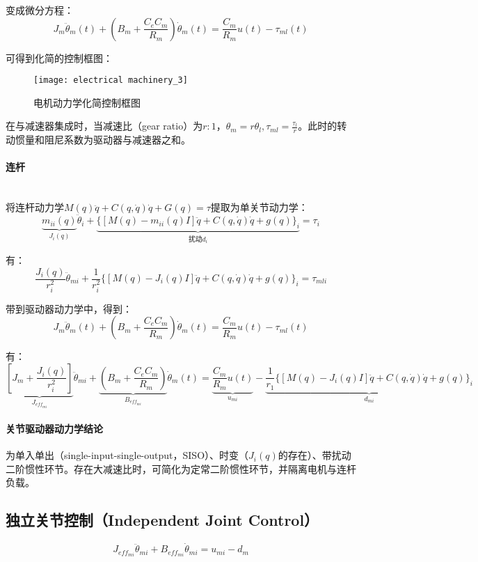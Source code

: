 \documentclass[
12pt, %
a4paper, 
oneside, %
headinclude,footinclude, %
]{scrartcl}
\begin{document}
变成微分方程：
$$ J_m \ddot{\theta}_m(t) + (B_m + \frac{C_e C_m}{R_m}) \dot{\theta}_m(t) = \frac{C_m}{R_m} u(t) - \tau_{ml}(t) $$

可得到化简的控制框图：
\begin{figure}[H]
\centering 
\texttt{[image: electrical machinery\_3]} 
\caption{电机动力学化简控制框图}
\end{figure}

在与减速器集成时，当减速比（gear ratio）为$ r:1 $，$ \theta_m = r \theta_l, \tau_{ml} = \frac{\tau_l}{r} $。此时的转动惯量和阻尼系数为驱动器与减速器之和。
\paragraph{连杆}~\\

将连杆动力学$ M(q)\ddot{q} + C(q, \dot{q})\dot{q} + G(q) = \tau $提取为单关节动力学：
$$ \underbrace{m_{ii}(q)}_{J_i(q)}\ddot{\theta}_i + \underbrace{\{[M(q) - m_{ii}(q)I]\ddot{q} + C(q, \dot{q})\dot{q} + g(q)\}_i}_{\text{扰动}d_i} = \tau_i $$

有：
$$ \frac{J_i(q)}{r_i^2}\ddot{\theta}_{mi} + \frac{1}{r_i^2}\{[M(q) - J_i(q)I]\ddot{q} + C(q, \dot{q})\dot{q} + g(q)\}_i = \tau_{mli} $$

带到驱动器动力学中，得到：
$$ J_m\ddot{\theta}_m(t) + (B_m + \frac{C_e C_m}{R_m})\dot{\theta}_m(t) = \frac{C_m}{R_m}u(t) - \tau_{ml}(t) $$

有：
$$ \underbrace{[J_m + \frac{J_i(q)}{r_i^2}]}_{J_{eff_{mi}}}\ddot{\theta}_{mi} + \underbrace{(B_m + \frac{C_e C_m}{R_m})}_{B_{eff_{mi}}}\dot{\theta}_m(t) = \underbrace{\frac{C_m}{R_m}u(t)}_{u_{mi}} - \underbrace{\frac{1}{r_1}\{[M(q) - J_i(q)I]\ddot{q} + C(q, \dot{q})\dot{q} + g(q)\}_i}_{d_{mi}} $$
\paragraph{关节驱动器动力学结论}
为单入单出（single-input-single-output，SISO）、时变（$ J_i(q) $的存在）、带扰动二阶惯性环节。存在大减速比时，可简化为定常二阶惯性环节，并隔离电机与连杆负载。
\subsection[独立关节控制]{独立关节控制（Independent Joint Control）}
$$ J_{eff_{mi}}\ddot{\theta}_{mi} + B_{eff_{mi}}\dot{\theta}_{mi} = u_{mi} - d_m $$
\end{document}
